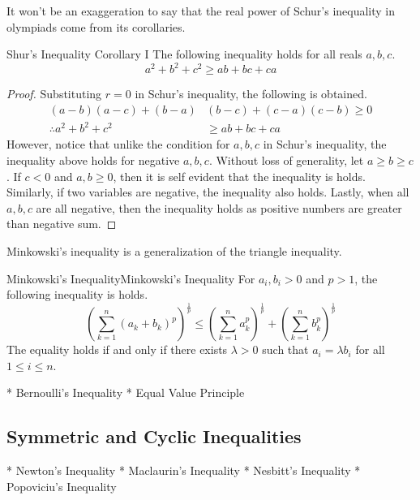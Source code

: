 \documentclass[../../main.tex]{subfiles}
\begin{document}
It won't be an exaggeration to say that the real power of Schur's
inequality in olympiads come from its corollaries.

\begin{corollary}{}{Shur's Inequality Corollary I}
The following inequality holds for all reals $a, b, c$.
\[
a^2 + b^2 + c^2 \geq ab + bc + ca
\]
\end{corollary}
\begin{proof}
Substituting $r = 0$ in Schur's inequality, the following is obtained.
\begin{align*}
    (a - b)(a - c) + (b - a)&(b - c) + (c - a)(c - b)
    \geq 0 \\
    \therefore a^2 + b^2 + c^2
    &\geq ab + bc + ca
\end{align*}
However, notice that unlike the condition for $a, b, c$ in Schur's
inequality, the inequality above holds for negative $a, b, c$.
Without loss of generality, let $a \geq b \geq c$. If $c < 0$ and
$a, b \geq 0$, then it is self evident that the inequality is holds.
Similarly, if two variables are negative, the inequality also holds.
Lastly, when all $a, b, c$ are all negative, then the inequality
holds as positive numbers are greater than negative sum.
\end{proof}






Minkowski's inequality is a generalization of the triangle inequality.

\begin{theorem}{Minkowski's Inequality}{Minkowski's Inequality}
For $a_i, b_i > 0$ and $p > 1$, the following inequality is holds.
\[
\left( \sum_{k = 1}^n (a_k + b_k)^p \right)^\frac{1}{p}
\leq
\left( \sum_{k = 1}^n a_k^p \right)^\frac{1}{p}
    + \left( \sum_{k = 1}^n b_k^p \right)^\frac{1}{p}
\]
The equality holds if and only if there exists $\lambda > 0$ such that
$a_i = \lambda b_i$ for all $1 \leq i \leq n$.
\end{theorem}


* Bernoulli’s Inequality
* Equal Value Principle

\subsection{Symmetric and Cyclic Inequalities}
* Newton's Inequality
* Maclaurin's Inequality
* Nesbitt's Inequality
* Popoviciu's Inequality
\end{document}
